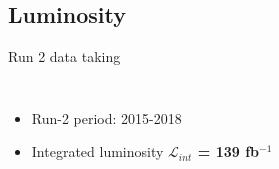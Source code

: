 \subsection{Luminosity}
\begin{frame}{Run 2 data taking}
    
\begin{columns}
\begin{itemize}
    \item Run-2 period: 2015-2018
    \item Integrated luminosity \textbf{$\mathcal{L}_{int}$ = 139 fb$^{-1}$}
\end{itemize}




\begin{figure}
    \centering
\end{figure}


\end{columns}  
\end{frame}

